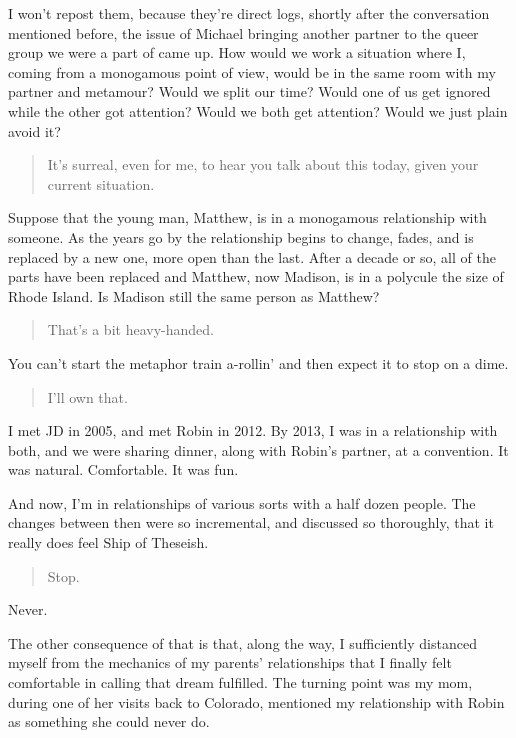 I won't repost them, because they're direct logs, shortly after the conversation mentioned before, the issue of Michael bringing another partner to the queer group we were a part of came up. How would we work a situation where I, coming from a monogamous point of view, would be in the same room with my partner and metamour? Would we split our time? Would one of us get ignored while the other got attention? Would we both get attention? Would we just plain avoid it?

\begin{quote}
It's surreal, even for me, to hear you talk about this today, given your current situation.
\end{quote}

Suppose that the young man, Matthew, is in a monogamous relationship with someone. As the years go by the relationship begins to change, fades, and is replaced by a new one, more open than the last. After a decade or so, all of the parts have been replaced and Matthew, now Madison, is in a polycule the size of Rhode Island. Is Madison still the same person as Matthew?

\begin{quote}
That's a bit heavy-handed.
\end{quote}

You can't start the metaphor train a-rollin' and then expect it to stop on a dime.

\begin{quote}
I'll own that.
\end{quote}

I met JD in 2005, and met Robin in 2012. By 2013, I was in a relationship with both, and we were sharing dinner, along with Robin's partner, at a convention. It was natural. Comfortable. It was fun.

And now, I'm in relationships of various sorts with a half dozen people. The changes between then were so incremental, and discussed so thoroughly, that it really does feel Ship of Theseish.

\begin{quote}
Stop.
\end{quote}

Never.

The other consequence of that is that, along the way, I sufficiently distanced myself from the mechanics of my parents' relationships that I finally felt comfortable in calling that dream fulfilled. The turning point was my mom, during one of her visits back to Colorado, mentioned my relationship with Robin as something she could never do.

